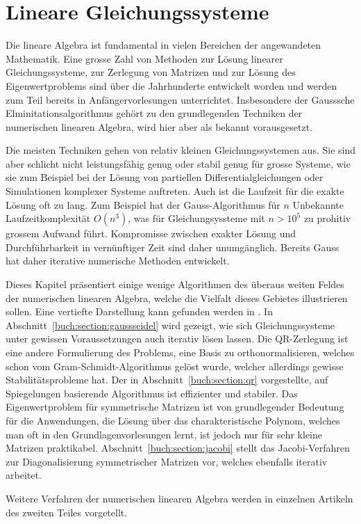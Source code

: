 %
%
%
\chapter{Lineare Gleichungssysteme\label{chapter:linsys}}
\rhead{}
Die lineare Algebra ist fundamental in vielen Bereichen der angewandeten
Mathematik.
Eine grosse Zahl von Methoden zur Lösung linearer
Gleichungssysteme, zur Zerlegung von Matrizen und zur Lösung des
Eigenwertproblems sind über die Jahrhunderte entwickelt worden und
werden zum Teil bereits in Anfängervorlesungen unterrichtet.
Insbesondere der Gausssche Elminitationsalgorithmus gehört zu den
grundlegenden Techniken der numerischen linearen Algebra, wird hier
aber als bekannt vorausgesetzt.

Die meisten Techniken gehen von relativ kleinen Gleichungssystemen aus.
Sie sind aber schlicht nicht leistungsfähig genug oder stabil genug für 
grosse Systeme, wie sie zum Beispiel bei der Lösung von partiellen
Differentialgleichungen oder Simulationen komplexer Systeme auftreten.
Auch ist die Laufzeit für die exakte Lösung oft zu lang.
Zum Beispiel hat der Gauss-Algorithmus für $n$ Unbekannte Laufzeitkomplexität
$O(n^3)$, was für Gleichungsyssteme mit $n>10^5$ zu prohitiv grossem
Aufwand führt.
Kompromisse zwischen exakter Lösung und Durchführbarkeit in vernünftiger
Zeit sind daher unumgänglich.
Bereits Gauss hat daher iterative numerische Methoden entwickelt.

Dieses Kapitel präsentiert einige wenige Algorithmen des überaus weiten
Feldes der numerischen linearen Algebra, welche die Vielfalt dieses
Gebietes illustrieren sollen.
Eine vertiefte Darstellung kann gefunden werden in \cite{buch:watkins}.
In Abschnitt~\ref{buch:section:gaussseidel} wird gezeigt, wie sich
Gleichungssysteme unter gewissen Voraussetzungen auch iterativ lösen
lassen.
Die QR-Zerlegung ist eine andere Formulierung des Problems, eine Basis
zu orthonormalisieren, welches schon vom Gram-Schmidt-Algorithmus gelöst
wurde, welcher allerdings gewisse Stabilitätsprobleme hat.
Der in Abschnitt~\ref{buch:section:qr} vorgestellte, auf Spiegelungen
basierende Algorithmus ist effizienter und stabiler.
Das Eigenwertproblem für symmetrische Matrizen ist von grundlegender
Bedeutung für die Anwendungen, die Lösung über das charakteristische 
Polynom, welches man oft in den Grundlagenvorlesungen lernt, ist jedoch
nur für sehr kleine Matrizen praktikabel.
Abschnitt~\ref{buch:section:jacobi} stellt das Jacobi-Verfahren zur
Diagonalisierung symmetrischer Matrizen vor, welches ebenfalls iterativ
arbeitet.

Weitere Verfahren der numerischen linearen Algebra werden in einzelnen
Artikeln des zweiten Teiles vorgetellt.









